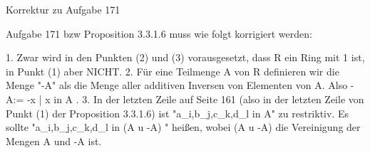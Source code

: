 Korrektur zu Aufgabe 171

Aufgabe 171 bzw Proposition 3.3.1.6 muss wie folgt korrigiert werden:

1. Zwar wird in den Punkten (2) und (3) vorausgesetzt, dass R ein Ring mit 1 ist, in Punkt (1) aber NICHT.
2. Für eine Teilmenge A von R definieren wir die Menge "-A" als die Menge aller additiven Inversen von Elementen von A.   Also -A:= { -x | x in A }.
3. In der letzten Zeile auf Seite 161 (also in der letzten Zeile von Punkt (1) der Proposition 3.3.1.6) ist  "a_i,b_j,c_k,d_l in A" zu restriktiv.  Es sollte "a_i,b_j,c_k,d_l in (A u -A) " heißen, wobei (A u -A) die Vereinigung der Mengen A und -A ist.

